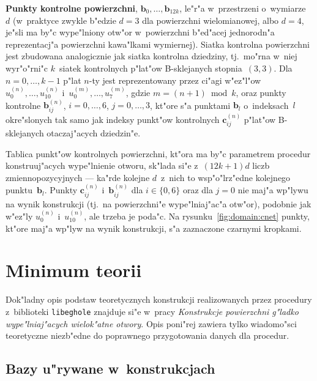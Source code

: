 \textbf{Punkty kontrolne powierzchni}, $\bm{b}_0,\ldots,\bm{b}_{12k}$, le"r"a
w~przestrzeni o~wymiarze~$d$ (w~praktyce zwykle b"edzie $d=3$ dla powierzchni
wielomianowej, albo $d=4$, je"sli ma by"c wype"lniony otw"or w~powierzchni
b"ed"acej jednorodn"a reprezentacj"a powierzchni kawa"lkami wymiernej).
Siatka kontrolna powierzchni jest zbudowana analogicznie jak siatka
kontrolna dziedziny, tj.\ mo"rna w~niej wyr"o"rni"c $k$~siatek kontrolnych
p"lat"ow B-sklejanych stopnia~$(3,3)$. Dla $n=0,\ldots,k-1$ p"lat $n$-ty jest
reprezentowany przez ci"agi w"ez"l"ow $u^{(n)}_0,\ldots,u^{(n)}_{10}$
i~$u^{(m)}_0,\ldots,u^{(m)}_7$, gdzie $m=(n+1)\bmod k$, oraz punkty kontrolne
$\bm{b}^{(n)}_{ij}$, $i=0,\ldots,6$, $j=0,\ldots,3$, kt"ore s"a punktami
$\bm{b}_l$ o~indeksach~$l$ okre"slonych tak samo jak indeksy punkt"ow
kontrolnych $\bm{c}^{(n)}_{ij}$ p"lat"ow B-sklejanych otaczaj"acych dziedzin"e.

Tablica punkt"ow kontrolnych powierzchni, kt"ora ma by"c parametrem procedur
konstruuj"acych wype"lnienie otworu, sk"lada si"e z~$(12k+1)d$ liczb
zmiennopozycyjnych --- ka"rde kolejne $d$~z~nich to wsp"o"lrz"edne kolejnego
punktu~$\bm{b}_l$. Punkty $\bm{c}^{(n)}_{ij}$ i~$\bm{b}^{(n)}_{ij}$
dla $i\in\{0,6\}$ oraz dla $j=0$ nie maj"a wp"lywu na wynik konstrukcji
(tj.\ na powierzchni"e wype"lniaj"ac"a otw"or), podobnie jak w"ez"ly
$u^{(n)}_0$ i~$u^{(n)}_{10}$, ale trzeba je poda"c. Na
rysunku~\ref{fig:domain:cnet} punkty, kt"ore maj"a wp"lyw na wynik konstrukcji,
s"a zaznaczone czarnymi kropkami.


\section{Minimum teorii}

Dok"ladny opis podstaw teoretycznych konstrukcji realizowanych przez procedury
z~biblioteki \texttt{libeghole} znajduje si"e w~pracy \emph{Konstrukcje
powierzchni g"ladko wype"lniaj"acych wielok"atne otwory}. Opis poni"rej
zawiera tylko wiadomo"sci teoretyczne niezb"edne do poprawnego przygotowania
danych dla procedur.

\subsection{Bazy u"rywane w~konstrukcjach}

